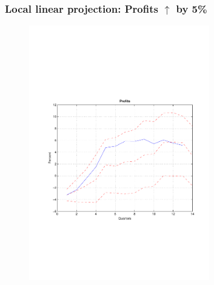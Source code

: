 \documentclass[pdflatex,aspectratio=169]{beamer}
\begin{document}
\begin{frame}\frametitle{\bf Local linear projection:   Profits $\uparrow$ by 5\% \hyperlink{Robust}{} \hypertarget{finInc}{}}
\begin{figure}
\begin{center}
\includegraphics[width=0.7\textwidth]{./figures/fProfits}\\
\end{center}
\end{figure}

\end{frame}
\end{document}
